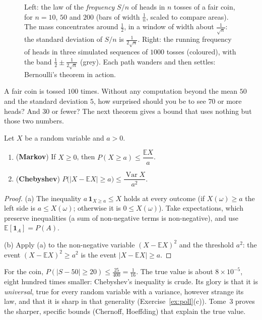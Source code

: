 \begin{figure}[ht]
\centering
{}
\caption{Left: the law of the \emph{frequency} $S/n$ of heads in $n$ tosses of a fair coin, for $n=10$, $50$ and $200$ (bars of width $\frac1n$, scaled to compare areas). The mass concentrates around $\frac12$, in a window of width about $\frac1{\sqrt n}$: the standard deviation of $S/n$ is $\frac1{2\sqrt n}$. Right: the running frequency of heads in three simulated sequences of $1000$ tosses (coloured), with the band $\frac12\pm\frac1{2\sqrt n}$ (grey). Each path wanders and then settles: Bernoulli's theorem in action.}
\label{fig:binomial}
\end{figure}

\begin{think}
A fair coin is tossed $100$ times. Without any computation beyond the mean $50$ and the standard deviation $5$, how surprised should you be to see $70$ or more heads? And $30$ or fewer? The next theorem gives a bound that uses nothing but those two numbers.
\end{think}

\begin{theorem}\label{thm:chebyshev}
Let $X$ be a random variable and $a>0$.
\begin{enumerate}[label=(\alph*)]
\item (\textbf{Markov}) If $X\ge0$, then $P(X\ge a)\le\dfrac{\mathbb E X}a$.
\item (\textbf{Chebyshev}) $P\big(|X-\mathbb EX|\ge a\big)\le\dfrac{\operatorname{Var}X}{a^2}$.
\end{enumerate}
\end{theorem}
\begin{proof}
(a) The inequality $a\,\mathbf 1_{X\ge a}\le X$ holds at every outcome (if $X(\omega)\ge a$ the left side is $a\le X(\omega)$; otherwise it is $0\le X(\omega)$). Take expectations, which preserve inequalities (a sum of non-negative terms is non-negative), and use $\mathbb E[\mathbf 1_A]=P(A)$.

(b) Apply (a) to the non-negative variable $(X-\mathbb EX)^2$ and the threshold $a^2$: the event $(X-\mathbb EX)^2\ge a^2$ is the event $|X-\mathbb EX|\ge a$.
\end{proof}

For the coin, $P(|S-50|\ge20)\le\frac{25}{400}=\frac1{16}$. The true value is about $8\times10^{-5}$, eight hundred times smaller: Chebyshev's inequality is crude. Its glory is that it is \emph{universal}, true for every random variable with a variance, however strange its law, and that it is sharp in that generality (Exercise~\ref{ex:poll}(c)). Tome~3 proves the sharper, specific bounds (Chernoff, Hoeffding) that explain the true value.

